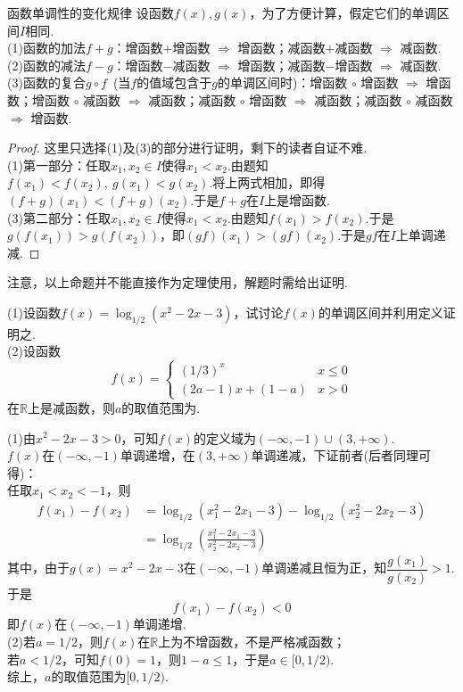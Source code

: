 \documentclass[lang=cn, zihao=5]{elegantbook}
\newcommand{\ssb}[1]{\left( #1 \right)}
\newcommand{\R}{\mathbb{R}}
\newcommand{\tk}{\uline{\hspace{4em}}}
\begin{document}
\begin{proposition}{函数单调性的变化规律}
    设函数$f(x),g(x)$，为了方便计算，假定它们的单调区间$I$相同.\\
    (1)函数的加法$f+g$：增函数$+$增函数 $\Rightarrow$ 增函数；减函数$+$减函数 $\Rightarrow$ 减函数.\\
    (2)函数的减法$f-g$：增函数$-$减函数 $\Rightarrow$ 增函数；减函数$-$增函数 $\Rightarrow$ 减函数.\\
    (3)函数的复合$g \circ f$~(当$f$的值域包含于$g$的单调区间时)：增函数 $\circ$ 增函数 $\Rightarrow$ 增函数；增函数 $\circ$ 减函数 $\Rightarrow$ 减函数；减函数 $\circ$ 增函数 $\Rightarrow$ 减函数；减函数 $\circ$ 减函数 $\Rightarrow$ 增函数.
\end{proposition}
\begin{proof}
    这里只选择(1)及(3)的部分进行证明，剩下的读者自证不难. \\
    (1)第一部分：任取$x_1,x_2 \in I$使得$x_1 < x_2$.由题知$f(x_1) < f(x_2),~g(x_1) < g(x_2)$.将上两式相加，即得$(f+g)(x_1) < (f+g)(x_2)$.于是$f+g$在$I$上是增函数. \\
    (3)第二部分：任取$x_1,x_2 \in I$使得$x_1 < x_2$.由题知$f(x_1) > f(x_2)$.于是$g(f(x_1)) > g(f(x_2))$，即$(gf)(x_1) > (gf)(x_2)$.于是$gf$在$I$上单调递减.
\end{proof}
\begin{remark}
	注意，以上命题并不能直接作为定理使用，解题时需给出证明.
\end{remark}

\begin{example}
	(1)设函数$f(x)=\log_{1/2}(x^2-2x-3)$，试讨论$f(x)$的单调区间并利用定义证明之. \\
	(2)设函数$$f(x)=\begin{cases}
		(1/3)^x &x \leq 0 \\ (2a-1)x+(1-a) & x>0
	\end{cases}$$在$\R$上是减函数，则$a$的取值范围为\tk .
\end{example}
\begin{solution}
	(1)由$x^2-2x-3 > 0$，可知$f(x)$的定义域为$(-\infty ,-1) \cup (3,+\infty)$. \\
	$f(x)$在$(-\infty ,-1)$单调递增，在$(3,+\infty)$单调递减，下证前者(后者同理可得)： \\
	任取$x_1<x_2<-1$，则
	\begin{align*}
		f(x_1)-f(x_2) &= \log_{1/2}(x_1^2-2x_1-3) - \log_{1/2}(x_2^2-2x_2-3) \\
		&= \log_{1/2}\ssb{\frac{x_1^2-2x_1-3}{x_2^2-2x_2-3}}
	\end{align*}
	其中，由于$g(x)=x^2-2x-3$在$(-\infty ,-1)$单调递减且恒为正，知$\dfrac{g(x_1)}{g(x_2)} > 1$.于是$$f(x_1)-f(x_2) < 0$$
	即$f(x)$在$(-\infty ,-1)$单调递增. \\
	(2)若$a=1/2$，则$f(x)$在$\R$上为不增函数，不是严格减函数； \\
	若$a < 1/2$，可知$f(0)=1$，则$1-a \leq 1$，于是$a \in [0,1/2)$. \\
	综上，$a$的取值范围为$[0,1/2)$.
\end{solution}
\end{document}
